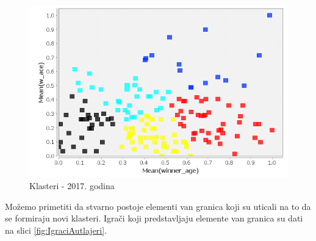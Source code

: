 \documentclass[a4paper]{article}
\begin{document}
\begin{figure}[H]
	\begin{center}
		\includegraphics[width=1\textwidth]{Klasterovanje/ScatterPlot_KMeans2017.png}
	\end{center}
	\caption{Klasteri - 2017. godina}
	\label{fig:KNIME_ScatterPlot2017}
\end{figure}

Možemo primetiti da stvarno postoje elementi van granica koji su uticali na to da se formiraju novi klasteri. Igrači koji predstavljaju elemente van granica su dati na slici \ref{fig:IgraciAutlajeri}. 
\end{document}
